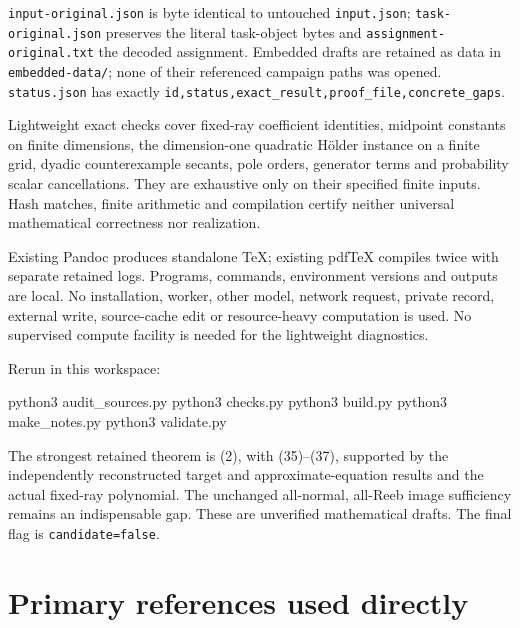 \documentclass[
  10pt,
]{article}
\newenvironment{Shaded}{}{}
\newcommand{\ExtensionTok}[1]{#1}
\newcommand{\NormalTok}[1]{#1}
\begin{document}
\texttt{input-original.json} is byte identical to untouched
\texttt{input.json}; \texttt{task-original.json} preserves the literal
task-object bytes and \texttt{assignment-original.txt} the decoded
assignment. Embedded drafts are retained as data in
\texttt{embedded-data/}; none of their referenced campaign paths was
opened. \texttt{status.json} has exactly
\texttt{id,status,exact\_result,proof\_file,concrete\_gaps}.

Lightweight exact checks cover fixed-ray coefficient identities,
midpoint constants on finite dimensions, the dimension-one quadratic
Hölder instance on a finite grid, dyadic counterexample secants, pole
orders, generator terms and probability scalar cancellations. They are
exhaustive only on their specified finite inputs. Hash matches, finite
arithmetic and compilation certify neither universal mathematical
correctness nor realization.

Existing Pandoc produces standalone TeX; existing pdfTeX compiles twice
with separate retained logs. Programs, commands, environment versions
and outputs are local. No installation, worker, other model, network
request, private record, external write, source-cache edit or
resource-heavy computation is used. No supervised compute facility is
needed for the lightweight diagnostics.

Rerun in this workspace:

\begin{Shaded}
\begin{Highlighting}[]
\ExtensionTok{python3}\NormalTok{ audit\_sources.py}
\ExtensionTok{python3}\NormalTok{ checks.py}
\ExtensionTok{python3}\NormalTok{ build.py}
\ExtensionTok{python3}\NormalTok{ make\_notes.py}
\ExtensionTok{python3}\NormalTok{ validate.py}
\end{Highlighting}
\end{Shaded}

The strongest retained theorem is (2), with (35)--(37), supported by the
independently reconstructed target and approximate-equation results and
the actual fixed-ray polynomial. The unchanged all-normal, all-Reeb
image sufficiency remains an indispensable gap. These are unverified
mathematical drafts. The final flag is \texttt{candidate=false}.

\section{Primary references used
directly}\label{primary-references-used-directly}
\end{document}
